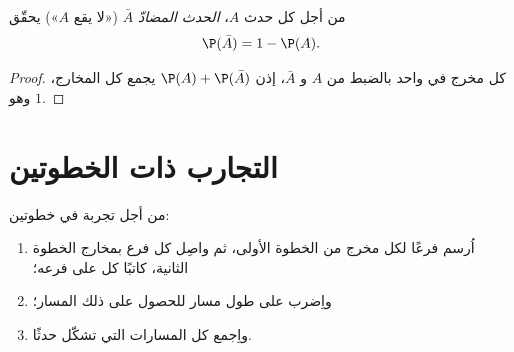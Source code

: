 \begin{proposition}\label{prop:g9:statproba:complement}
من أجل كل حدث $A$، \emph{الحدث المضادّ} $\bar A$ («لا يقع $A$»)
يحقّق
\[
\P(\bar A) = 1 - \P(A).
\]
\end{proposition}

\begin{proof}
كل مخرج في واحد بالضبط من $A$ و $\bar A$، إذن
$\P(A) + \P(\bar A)$ يجمع  كل المخارج، وهو
$1$.
\end{proof}

\section{التجارب ذات الخطوتين}

\begin{method}\label{met:g9:statproba:tree}
من أجل تجربة في خطوتين:
\begin{enumerate}
  \item اُرسم فرعًا لكل مخرج من الخطوة الأولى، ثم واصِل كل فرع
        بمخارج الخطوة الثانية، كاتبًا كل  على فرعه؛
  \item واِضرب  على طول مسار للحصول على  ذلك
        المسار؛
  \item واِجمع  كل المسارات التي تشكّل حدثًا.
\end{enumerate}
\end{method}


